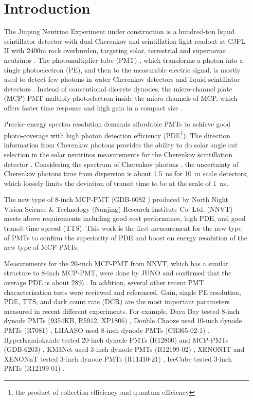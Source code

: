 \section{Introduction}
The Jinping Neutrino Experiment under construction is a hundred-ton liquid scintillator detector with dual Cherenkov and scintillation light readout
 at CJPL II with 2400m rock overburden, targeting solar, terrestrial and supernovae neutrinos \cite{LetterJNE2017}. %
The photomultiplier tube (PMT) \cite{HAMAMATSUManual}, which transforms a photon into a single photoelectron (PE), and then to the measurable electric signal, is mostly used to detect few photons in water Cherenkov detectors \cite{SNO,SuperK} and liquid scintillator detectors \cite{KamLAND,JUNO:2015zny}. Instead of conventional discrete dynodes, the micro-channel plate (MCP) PMT multiply photoelectron inside the micro-channels of MCP, which offers faster time response and high gain in a compact size \cite{HAMAMATSUManual}.

Precise energy spectra resolution demands affordable PMTs to achieve good photo-coverage with high photon detection efficiency (PDE\footnote{the product of collection efficiency and quantum efficiency}). The direction information from Cherenkov photons provides the ability to do solar angle cut selection in the solar neutrinos measurements for the Cherenkov scintillation detector \cite{Guo_2019}. Considering the spectrum of Cherenkov photons \cite{Luo:2022xrd}, the uncertainty of Cherenkov photons time from dispersion is about \SI{1.5}{ns} for \SI{10}{m} scale detectors, which loosely limits the deviation of transit time to be at the scale of \SI{1}{ns}.

The new type of 8-inch MCP-PMT (GDB-6082 \cite{GDB-6082}) produced by North Night Vision Science \& Technology (Nanjing) Research Institute Co. Ltd. (NNVT) meets above requirements including good cost performance, high PDE, and good transit time spread (TTS). This work is the first measurement for the new type of PMTs to confirm the superiority of PDE and boost on energy resolution of the new type of MCP-PMTs.

Measurements for the 20-inch MCP-PMT from NNVT, which has a similar structure to 8-inch MCP-PMT, were done by JUNO and confirmed that the average PDE is about 28\% \cite{JUNOMassTesting}. In addition, several other recent PMT characterization tests were reviewed and referenced. Gain, single PE resolution, PDE, TTS, and dark count rate (DCR) are the most important parameters measured in recent different experiments. For example, Daya Bay tested 8-inch dynode PMTs (9354KB, R5912, XP1806) \cite{DayaBayTesting}, Double Chooze used 10-inch dynode PMTs (R7081) \cite{DoubleChoozeTesting}, LHAASO used 8-inch dynode PMTs (CR365-02-1) \cite{LHAASOTesting}, HyperKamiokande tested 20-inch dynode PMTs (R12860) and MCP-PMTs (GDB-6203) \cite{HyperKTesting}, KM3Net used 3-inch dynode PMTs (R12199-02) \cite{KM3NetTesting}, XENON1T and XENONnT tested 3-inch dynode PMTs (R11410-21) \cite{XENON1TTesting}\cite{XENONnTTesting}, IceCube tested 3-inch PMTs (R12199-01) \cite{IceCubeTesting}.

